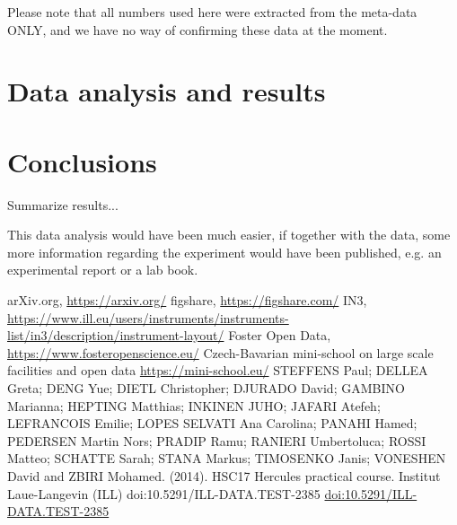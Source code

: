 \documentclass[aps,prx,reprint,amsmath,amssymb,superscriptaddress,showpacs]{revtex4-1}
\begin{document}
Please note that all numbers used here were extracted from the meta-data ONLY, and we have no way of confirming these data at the moment. 


\section{Data analysis and results}



\section{Conclusions}

Summarize results...

This data analysis would have been much easier, if together with the data, some more information regarding the experiment would have been published, e.g. an experimental report or a lab book.


\begin{thebibliography}{9}

 arXiv.org, \url{https://arxiv.org/}
 figshare, \url{https://figshare.com/}
 IN3, \url{https://www.ill.eu/users/instruments/instruments-list/in3/description/instrument-layout/}
 Foster Open Data, \url{https://www.fosteropenscience.eu/}
 Czech-Bavarian mini-school on large scale facilities and open data \url{https://mini-school.eu/}
STEFFENS Paul; DELLEA Greta; DENG Yue; DIETL Christopher; DJURADO David; GAMBINO Marianna; HEPTING Matthias; INKINEN JUHO; JAFARI Atefeh; LEFRANCOIS Emilie; LOPES SELVATI Ana Carolina; PANAHI Hamed; PEDERSEN Martin Nors; PRADIP Ramu; RANIERI Umbertoluca; ROSSI Matteo; SCHATTE Sarah; STANA Markus; TIMOSENKO Janis; VONESHEN David and ZBIRI Mohamed. (2014). HSC17 Hercules practical course. Institut Laue-Langevin (ILL) doi:10.5291/ILL-DATA.TEST-2385 \url{doi:10.5291/ILL-DATA.TEST-2385}

\end{thebibliography}
\end{document}

